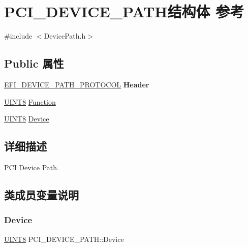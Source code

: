 \hypertarget{struct_p_c_i___d_e_v_i_c_e___p_a_t_h}{}\section{P\+C\+I\+\_\+\+D\+E\+V\+I\+C\+E\+\_\+\+P\+A\+T\+H结构体 参考}
\label{struct_p_c_i___d_e_v_i_c_e___p_a_t_h}


{\ttfamily \#include $<$Device\+Path.\+h$>$}

\subsection*{Public 属性}
\begin{DoxyCompactItemize}
\item 
\mbox{\label{struct_p_c_i___d_e_v_i_c_e___p_a_t_h_a109ee7b7842261d42dc4a80fbbc1f450}} 
\hyperlink{struct_e_f_i___d_e_v_i_c_e___p_a_t_h___p_r_o_t_o_c_o_l}{E\+F\+I\+\_\+\+D\+E\+V\+I\+C\+E\+\_\+\+P\+A\+T\+H\+\_\+\+P\+R\+O\+T\+O\+C\+OL} {\bfseries Header}
\item 
\hyperlink{_processor_bind_8h_ab27e9918b538ce9d8ca692479b375b6a}{U\+I\+N\+T8} \hyperlink{struct_p_c_i___d_e_v_i_c_e___p_a_t_h_aeb5b1b697ed4cd648567150e2e00f718}{Function}
\item 
\hyperlink{_processor_bind_8h_ab27e9918b538ce9d8ca692479b375b6a}{U\+I\+N\+T8} \hyperlink{struct_p_c_i___d_e_v_i_c_e___p_a_t_h_a466b092934080033e0d2cf46d7b5f058}{Device}
\end{DoxyCompactItemize}


\subsection{详细描述}
P\+CI Device Path. 

\subsection{类成员变量说明}
\mbox{\label{struct_p_c_i___d_e_v_i_c_e___p_a_t_h_a466b092934080033e0d2cf46d7b5f058}} 
\subsubsection{\texorpdfstring{Device}{Device}}
{\footnotesize\ttfamily \hyperlink{_processor_bind_8h_ab27e9918b538ce9d8ca692479b375b6a}{U\+I\+N\+T8} P\+C\+I\+\_\+\+D\+E\+V\+I\+C\+E\+\_\+\+P\+A\+T\+H\+::\+Device}

